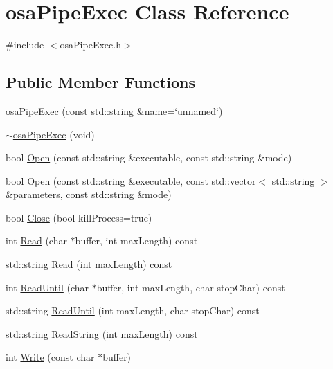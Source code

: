 \hypertarget{classosa_pipe_exec}{\section{osa\-Pipe\-Exec Class Reference}
\label{classosa_pipe_exec}
}


{\ttfamily \#include $<$osa\-Pipe\-Exec.\-h$>$}

\subsection*{Public Member Functions}
\begin{DoxyCompactItemize}
\item 
\hyperlink{classosa_pipe_exec_a782d03c0baeadfc1f7cac158b1a08514}{osa\-Pipe\-Exec} (const std\-::string \&name=\char`\"{}unnamed\char`\"{})
\item 
\hyperlink{classosa_pipe_exec_ae47595e886ef8976a10c19498e7e0494}{$\sim$osa\-Pipe\-Exec} (void)
\item 
bool \hyperlink{classosa_pipe_exec_a1e8c63d5b5e88d9e7e55323a3aed86ce}{Open} (const std\-::string \&executable, const std\-::string \&mode)
\item 
bool \hyperlink{classosa_pipe_exec_a944441db45e47c0365d29bdd3ebf04e6}{Open} (const std\-::string \&executable, const std\-::vector$<$ std\-::string $>$ \&parameters, const std\-::string \&mode)
\item 
bool \hyperlink{classosa_pipe_exec_afa164cafaeb53cc0add1fe28b6a12149}{Close} (bool kill\-Process=true)
\item 
int \hyperlink{classosa_pipe_exec_a6cb69a8b0b8dc222f64302340b3ee397}{Read} (char $\ast$buffer, int max\-Length) const 
\item 
std\-::string \hyperlink{classosa_pipe_exec_a6ff1f190850c432025a4134e1caf000d}{Read} (int max\-Length) const 
\item 
int \hyperlink{classosa_pipe_exec_abc2fc682f8674a1ee01588b8b0fe9034}{Read\-Until} (char $\ast$buffer, int max\-Length, char stop\-Char) const 
\item 
std\-::string \hyperlink{classosa_pipe_exec_a4d0fa04f0fe18b500bdc4aac3348d4b6}{Read\-Until} (int max\-Length, char stop\-Char) const 
\item 
std\-::string \hyperlink{classosa_pipe_exec_ac56211fae748911bc7202c4e0cea9f80}{Read\-String} (int max\-Length) const 
\item 
int \hyperlink{classosa_pipe_exec_ad3d51e076b28f55590a7a0ae3b158d03}{Write} (const char $\ast$buffer)

\end{DoxyCompactItemize}

